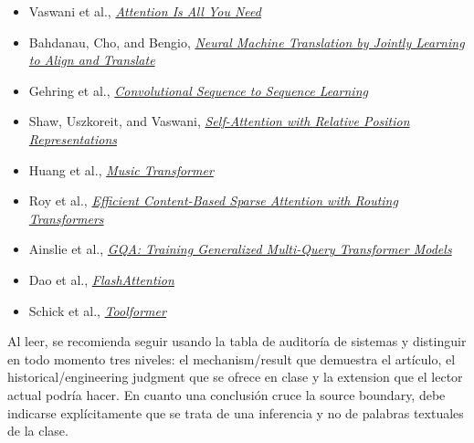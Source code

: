 \begingroup
\footnotesize
\begin{itemize}[itemsep=0pt,topsep=0.15em,parsep=0pt]
  \item Vaswani et al., \href{https://arxiv.org/abs/1706.03762}{\emph{Attention Is All You Need}}
  \item Bahdanau, Cho, and Bengio, \href{https://arxiv.org/abs/1409.0473}{\emph{Neural Machine Translation by Jointly Learning to Align and Translate}}
  \item Gehring et al., \href{https://arxiv.org/abs/1705.03122}{\emph{Convolutional Sequence to Sequence Learning}}
  \item Shaw, Uszkoreit, and Vaswani, \href{https://arxiv.org/abs/1803.02155}{\emph{Self-Attention with Relative Position Representations}}
  \item Huang et al., \href{https://arxiv.org/abs/1809.04281}{\emph{Music Transformer}}
  \item Roy et al., \href{https://arxiv.org/abs/2003.05997}{\emph{Efficient Content-Based Sparse Attention with Routing Transformers}}
  \item Ainslie et al., \href{https://arxiv.org/abs/2305.13245}{\emph{GQA: Training Generalized Multi-Query Transformer Models}}
  \item Dao et al., \href{https://arxiv.org/abs/2205.14135}{\emph{FlashAttention}}
  \item Schick et al., \href{https://arxiv.org/abs/2302.04761}{\emph{Toolformer}}
\end{itemize}

Al leer, se recomienda seguir usando la tabla de auditoría de sistemas y distinguir en todo momento tres niveles: el mechanism/result que demuestra el artículo, el historical/engineering judgment que se ofrece en clase y la extension que el lector actual podría hacer. En cuanto una conclusión cruce la source boundary, debe indicarse explícitamente que se trata de una inferencia y no de palabras textuales de la clase.
\endgroup


